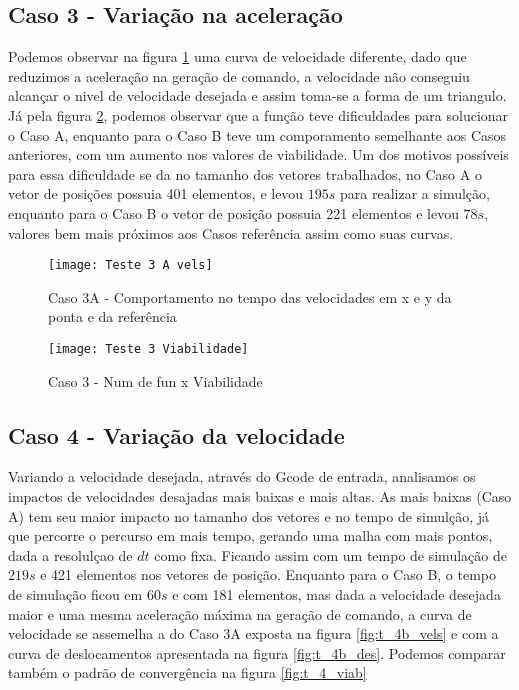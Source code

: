 \subsection{Caso 3 - Variação na aceleração}
Podemos observar na figura \ref{fig:t_3a_vels} uma curva de velocidade diferente, dado que reduzimos a aceleração
na geração de comando, a velocidade não conseguiu alcançar o nivel de velocidade desejada e assim toma-se a forma de um triangulo.
Já pela figura \ref{fig:t_3_viab}, podemos observar que a função teve dificuldades para solucionar o Caso A, enquanto para o Caso B
teve um comporamento semelhante aos Casos anteriores, com um aumento nos valores de viabilidade.
Um dos motivos possíveis para essa dificuldade se da no tamanho dos vetores trabalhados, no Caso A o vetor de posições
possuia 401 elementos, e levou $195 s$ para realizar a simulção, enquanto para o Caso B o vetor de posição possuia 221 elementos
e levou $78 s$, valores bem mais próximos aos Casos referência assim como suas curvas.

\begin{figure}[!htb]
    \begin{center}
    \caption{Caso 3A - Comportamento no tempo das velocidades em x e y da ponta e da referência}
    \texttt{[image: Teste 3 A vels]}
    \label{fig:t_3a_vels}
    \end{center}
\end{figure}

\begin{figure}[!htb]
    \begin{center}
    \caption{Caso 3 - Num de fun x Viabilidade}
    \texttt{[image: Teste 3 Viabilidade]}
    \label{fig:t_3_viab}
    \end{center}
\end{figure}

\subsection{Caso 4 - Variação da velocidade}
Variando a velocidade desejada, através do Gcode de entrada, analisamos os impactos de velocidades desajadas mais baixas e mais altas.
As mais baixas (Caso A) tem seu maior impacto no tamanho dos vetores e no tempo de simulção, já que percorre o percurso em mais tempo,
gerando uma malha com mais pontos, dada a resolulçao de $dt$ como fixa. Ficando assim com um tempo de simulação de $219 s$ e 421 elementos nos vetores de posição.
Enquanto para o Caso B, o tempo de simulação ficou em $60 s$ e com 181 elementos, mas dada a velocidade desejada maior e uma mesma aceleração máxima
na geração de comando, a curva de velocidade se assemelha a do Caso 3A exposta na figura \ref{fig:t_4b_vels} e com a curva de deslocamentos apresentada na figura \ref{fig:t_4b_des}.
Podemos comparar também o padrão de convergência na figura \ref{fig:t_4_viab}

